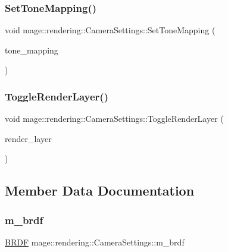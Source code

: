 \subsubsection{\texorpdfstring{Set\+Tone\+Mapping()}{SetToneMapping()}}
{\footnotesize\ttfamily void mage\+::rendering\+::\+Camera\+Settings\+::\+Set\+Tone\+Mapping (\begin{DoxyParamCaption}\item[{\mbox{\hyperlink{namespacemage_1_1rendering_a789e4b7d9a8cc831b065e9c6bb7430e9}{Tone\+Mapping}}}]{tone\+\_\+mapping }\end{DoxyParamCaption})\hspace{0.3cm}{\ttfamily [noexcept]}}

\mbox{\label{classmage_1_1rendering_1_1_camera_settings_a95c531aba7bbddba9ea47000de3c53b2}} 
\subsubsection{\texorpdfstring{Toggle\+Render\+Layer()}{ToggleRenderLayer()}}
{\footnotesize\ttfamily void mage\+::rendering\+::\+Camera\+Settings\+::\+Toggle\+Render\+Layer (\begin{DoxyParamCaption}\item[{\mbox{\hyperlink{namespacemage_1_1rendering_a466c2a441ea5b26e4625c2f34e021b3d}{Render\+Layer}}}]{render\+\_\+layer }\end{DoxyParamCaption})\hspace{0.3cm}{\ttfamily [noexcept]}}



\subsection{Member Data Documentation}
\mbox{\label{classmage_1_1rendering_1_1_camera_settings_a18daf9b9c8c7319e7db996a406aa0a43}} 
\subsubsection{\texorpdfstring{m\+\_\+brdf}{m\_brdf}}
{\footnotesize\ttfamily \mbox{\hyperlink{namespacemage_1_1rendering_ab8fe8684ca4bd74ba3a394b00cf125b5}{B\+R\+DF}} mage\+::rendering\+::\+Camera\+Settings\+::m\+\_\+brdf\hspace{0.3cm}{\ttfamily [private]}}


